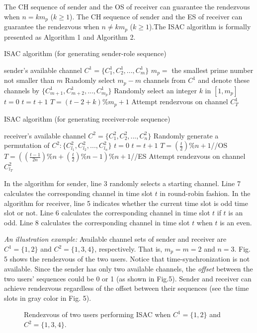 \documentclass[journal]{IEEEtran}
\begin{document}
\par The CH sequence of sender and the OS of receiver can guarantee the rendezvous when $n=km_p$ ($k\geq1$). The CH sequence of sender and the ES of receiver can guarantee the rendezvous when $n\neq km_p$ ($k\geq1$).The ISAC algorithm is formally presented as Algorithm 1 and Algorithm 2.
\begin{algorithm}
\caption{ISAC algorithm (for generating sender-role sequence)}
\label{alg:Random Algorithm}
\begin{algorithmic}[1]
\REQUIRE sender's available channel $C^1=\{C_1^1, C_2^1, ..., C_m^1\}$
\STATE $m_p=$ the smallest prime number not smaller than $m$
\STATE Randomly select $m_p-m$ channels from $C^1$ and denote these channels by $\{C_{m+1}^1, C_{m+2}^1, ..., C_{m_p}^1\}$
\STATE Randomly select an integer $k$ in $[1, m_p]$
\STATE $t=0$
\STATE $t=t+1$
\STATE $T=(t-2+k)\%m_p +1$
\STATE Attempt rendezvous on channel $C_T^1$
\ENDWHILE
\end{algorithmic}
\end{algorithm}
\begin{algorithm}
\caption{ISAC algorithm (for generating receiver-role sequence)}
\label{alg:Random Algorithm}
\begin{algorithmic}[1]
\REQUIRE receiver's available channel $C^2=\{C_1^2, C_2^2, ..., C_n^2\}$
\STATE Randomly generate a permutation of $C^2: \{C_{l_1}^2, C_{l_2}^2, ..., C_{l_n}^2\}$
\STATE $t=0$
\STATE $t=t+1$
\STATE $T=(\frac{t}{2})\%n +1$\quad\quad\quad\quad\quad\quad\quad\quad\quad\quad//OS
\ELSE
\STATE $T=((\frac{t-1}{2n})\%n +(\frac{t}{2})\%n -1)\% n+1$\quad\quad//ES
\ENDIF
\STATE Attempt rendezvous on channel $C_{l_T}^2$
\ENDWHILE
\end{algorithmic}
\end{algorithm}
\par In the algorithm for sender, line 3 randomly selects a starting channel. Line 7 calculates the corresponding channel in time slot $t$ in round-robin fashion. In the algorithm for receiver, line 5 indicates whether the current time slot is odd time slot or not. Line 6 calculates the corresponding channel in time slot $t$ if $t$ is an odd. Line 8 calculates the corresponding channel in time slot $t$ when $t$ is an even.
\par \emph{An illustration example:} Available channel sets of sender and receiver are $C^1=\{1, 2\}$ and $C^2=\{1, 3, 4\}$, respectively. That is, $m_p=m=2$ and $n=3$. Fig. 5 shows the rendezvous of the two users. Notice that time-synchronization is not available. Since the sender has only two available channels, the \emph{offset} between the two users' sequences could be 0 or 1 (as shown in Fig.5). Sender and receiver can achieve rendezvous regardless of the offset between their sequences (see the time slots in gray color in Fig. 5).
\begin{figure}
\centering
{}
\hspace{1in}
\caption{Rendezvous of two users performing ISAC when $C^1=\{1, 2\}$ and $C^2=\{1, 3, 4\}$.}
\end{figure}
\end{document}
